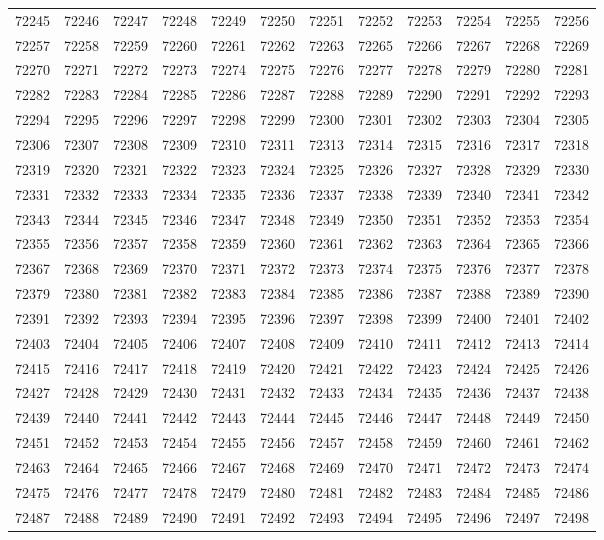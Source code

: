 \begin{center}
\begin{longtable}{llllllllllll}
72245 &72246 &72247 &72248 &72249 &72250 &72251 &72252 &72253 &72254 &72255 &72256 \\
72257 &72258 &72259 &72260 &72261 &72262 &72263 &72265 &72266 &72267 &72268 &72269 \\
72270 &72271 &72272 &72273 &72274 &72275 &72276 &72277 &72278 &72279 &72280 &72281 \\
72282 &72283 &72284 &72285 &72286 &72287 &72288 &72289 &72290 &72291 &72292 &72293 \\
72294 &72295 &72296 &72297 &72298 &72299 &72300 &72301 &72302 &72303 &72304 &72305 \\
72306 &72307 &72308 &72309 &72310 &72311 &72313 &72314 &72315 &72316 &72317 &72318 \\
72319 &72320 &72321 &72322 &72323 &72324 &72325 &72326 &72327 &72328 &72329 &72330 \\
72331 &72332 &72333 &72334 &72335 &72336 &72337 &72338 &72339 &72340 &72341 &72342 \\
72343 &72344 &72345 &72346 &72347 &72348 &72349 &72350 &72351 &72352 &72353 &72354 \\
72355 &72356 &72357 &72358 &72359 &72360 &72361 &72362 &72363 &72364 &72365 &72366 \\
72367 &72368 &72369 &72370 &72371 &72372 &72373 &72374 &72375 &72376 &72377 &72378 \\
72379 &72380 &72381 &72382 &72383 &72384 &72385 &72386 &72387 &72388 &72389 &72390 \\
72391 &72392 &72393 &72394 &72395 &72396 &72397 &72398 &72399 &72400 &72401 &72402 \\
72403 &72404 &72405 &72406 &72407 &72408 &72409 &72410 &72411 &72412 &72413 &72414 \\
72415 &72416 &72417 &72418 &72419 &72420 &72421 &72422 &72423 &72424 &72425 &72426 \\
72427 &72428 &72429 &72430 &72431 &72432 &72433 &72434 &72435 &72436 &72437 &72438 \\
72439 &72440 &72441 &72442 &72443 &72444 &72445 &72446 &72447 &72448 &72449 &72450 \\
72451 &72452 &72453 &72454 &72455 &72456 &72457 &72458 &72459 &72460 &72461 &72462 \\
72463 &72464 &72465 &72466 &72467 &72468 &72469 &72470 &72471 &72472 &72473 &72474 \\
72475 &72476 &72477 &72478 &72479 &72480 &72481 &72482 &72483 &72484 &72485 &72486 \\
72487 &72488 &72489 &72490 &72491 &72492 &72493 &72494 &72495 &72496 &72497 &72498 \\

\end{longtable}
\end{center}
